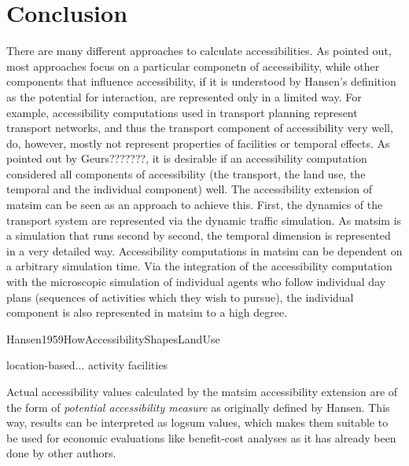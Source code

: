 \section{Conclusion}
There are many different approaches to calculate accessibilities. As pointed out, most approaches focus on a particular 
componetn of accessibility, while other components that influence accessibility, if it is understood by Hansen's definition 
as the potential for interaction, are represented only in a limited way. For example, accessibility computations used in 
transport planning represent transport networks, and thus the transport component of accessibility very well, do, however, 
mostly not represent properties of facilities or temporal effects. As pointed out by Geurs???????, it is desirable if an 
accessibility computation considered all components of accessibility (the transport, the land use, the temporal and the 
individual component) well. The accessibility extension of \gls{matsim} can be seen as an approach to achieve this. First, 
the dynamics of the transport system are represented via the dynamic traffic simulation. As \gls{matsim} is a simulation 
that runs second by second, the temporal dimension is represented in a very detailed way. Accessibility computations in 
\gls{matsim} can be dependent on a arbitrary simulation time. Via the integration of the accessibility computation with 
the microscopic simulation of individual agents who follow individual day plans (sequences of activities which they 
wish to pursue), the individual component is also represented in \gls{matsim} to a high degree.

Hansen1959HowAccessibilityShapesLandUse

location-based... activity facilities

Actual accessibility values calculated by the \gls{matsim} accessibility extension are of the form of \textit{potential 
	accessibility measure} as originally defined by Hansen. This way, results can be interpreted as \gls{logsum} values, 
which makes them suitable to be used for economic evaluations like benefit-cost analyses as it has already been done 
by other authors.




